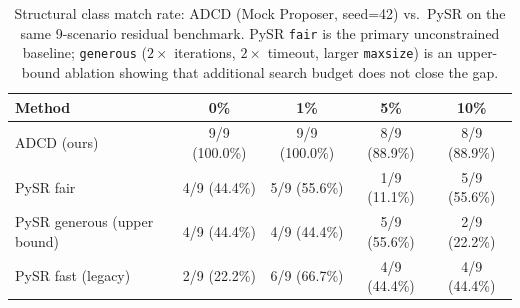 \begin{table}[t]
\centering
\caption{Structural class match rate: ADCD (Mock Proposer, seed=42) vs.\ PySR on the same 9-scenario residual benchmark. PySR \texttt{fair} is the primary unconstrained baseline; \texttt{generous} ($2\times$ iterations, $2\times$ timeout, larger \texttt{maxsize}) is an upper-bound ablation showing that additional search budget does not close the gap.}
\label{tab:baseline}
\begin{tabular}{lcccc}
\toprule
\textbf{Method} & \textbf{0\%} & \textbf{1\%} & \textbf{5\%} & \textbf{10\%} \\
\midrule
ADCD (ours) & 9/9 (100.0\%) & 9/9 (100.0\%) & 8/9 (88.9\%) & 8/9 (88.9\%) \\
PySR fair & 4/9 (44.4\%) & 5/9 (55.6\%) & 1/9 (11.1\%) & 5/9 (55.6\%) \\
PySR generous (upper bound) & 4/9 (44.4\%) & 4/9 (44.4\%) & 5/9 (55.6\%) & 2/9 (22.2\%) \\
PySR fast (legacy) & 2/9 (22.2\%) & 6/9 (66.7\%) & 4/9 (44.4\%) & 4/9 (44.4\%) \\
\bottomrule
\end{tabular}
\end{table}